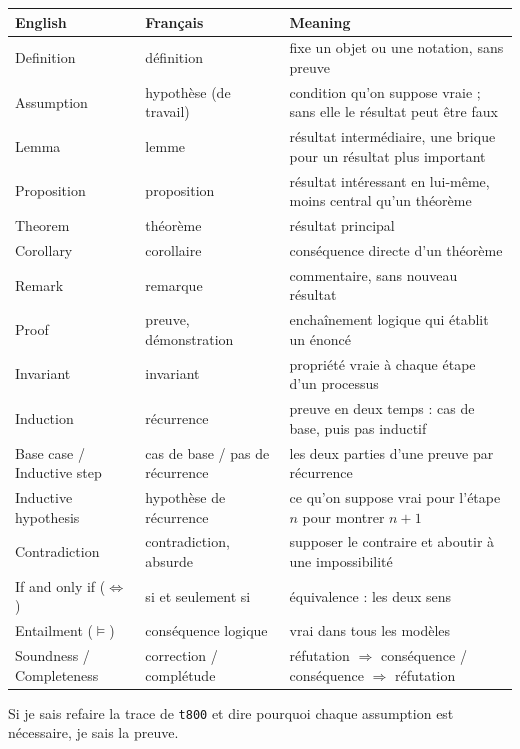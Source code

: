 \documentclass[10pt]{article}
\begin{document}
\renewcommand{\arraystretch}{1.25}
\begin{tabular}{@{}L{3.6cm}L{3.4cm}L{9.4cm}@{}}
\textbf{English} & \textbf{Français} & \textbf{Meaning}\\\hline
Definition & définition & fixe un objet ou une notation, sans preuve\\
Assumption & hypothèse (de travail) & condition qu'on suppose vraie ; sans elle le résultat peut être faux\\
Lemma & lemme & résultat intermédiaire, une brique pour un résultat plus important\\
Proposition & proposition & résultat intéressant en lui-même, moins central qu'un théorème\\
Theorem & théorème & résultat principal\\
Corollary & corollaire & conséquence directe d'un théorème\\
Remark & remarque & commentaire, sans nouveau résultat\\
Proof & preuve, démonstration & enchaînement logique qui établit un énoncé\\
Invariant & invariant & propriété vraie à chaque étape d'un processus\\
Induction & récurrence & preuve en deux temps : cas de base, puis pas inductif\\
Base case / Inductive step & cas de base / pas de récurrence & les deux parties d'une preuve par récurrence\\
Inductive hypothesis & hypothèse de récurrence & ce qu'on suppose vrai pour l'étape $n$ pour montrer $n+1$\\
Contradiction & contradiction, absurde & supposer le contraire et aboutir à une impossibilité\\
If and only if ($\iff$) & si et seulement si & équivalence : les deux sens\\
Entailment ($\models$) & conséquence logique & vrai dans tous les modèles\\
Soundness / Completeness & correction / complétude & réfutation $\Rightarrow$ conséquence / conséquence $\Rightarrow$ réfutation\\
\end{tabular}

\vspace{8pt}
\begin{tcolorbox}[colback=marine, colframe=marine, arc=0pt, boxrule=0pt,
  halign=center, top=4pt, bottom=4pt]
\color{white}\small Si je sais refaire la trace de \texttt{t800} et dire pourquoi chaque assumption est nécessaire, je sais la preuve.
\end{tcolorbox}
\end{document}
